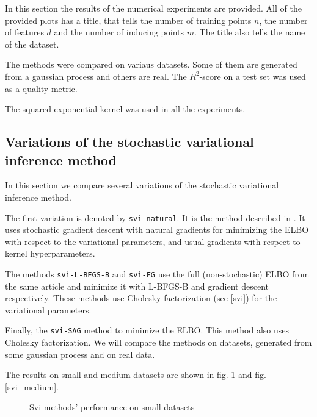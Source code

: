 In this section the results of the numerical experiments are provided. All of the provided plots has a title, that tells the number of training points $n$, the number of features $d$ and the number of inducing points $m$. The title also tells the name of the dataset.

	The methods were compared on variaus datasets. Some of them are generated from a gaussian process and others are real. The $R^2$-score on a test set was used as a quality metric. 

	The squared exponential kernel was used in all the experiments.

	\subsection{Variations of the stochastic variational inference method}
		In this section we compare several variations of the stochastic variational inference method.

		The first variation is denoted by \lstinline{svi-natural}. It is the method described in \cite{BigData}. It uses stochastic gradient descent with natural gradients for minimizing the ELBO with respect to the variational parameters, and usual gradients with respect to kernel hyperparameters.

		The methods \lstinline{svi-L-BFGS-B} and \lstinline{svi-FG} use the full (non-stochastic) ELBO from the same article \cite{BigData} and minimize it with L-BFGS-B and gradient descent respectively. These methods use Cholesky factorization (see \ref{svi}) for the variational parameters.

		Finally, the \lstinline{svi-SAG} method to minimize the ELBO. This method also uses Cholesky factorization.
		We will compare the methods on datasets, generated from some gaussian process and on real data. 


		The results on small and medium datasets are shown in fig. \ref{svi_small} and fig. \ref{svi_medium}.

		\begin{figure}[h!]
			\centering

			\subfloat{
				\scalebox{0.75}{
					
				}
			}
			\subfloat{
				\scalebox{0.75}{
		    		
				}
			}
			\vspace{0.1cm}
			\caption{Svi methods' performance on small datasets}
			\label{svi_small}
		\end{figure}



